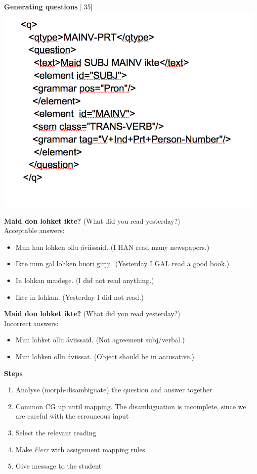 \documentclass[landscape,norsk,11pt]{seminar}
\begin{document}
\begin{slide}
\newslide
\textbf{Generating questions}
\scalebox{.35}[.35]{\includegraphics{img/xml_question.png}}



\newslide
\textbf{Maid don lohket ikte?}
(What did you read yesterday?) \\
Acceptable answers:
\begin{itemize}
\item Mun han lohken ollu \'aviissaid. (I HAN read many newspapers.)
\item Ikte mun gal lohken buori girjji. (Yesterday I GAL read a good book.)
\item In lohkan maidege. (I did not read anything.)
\item Ikte in lohkan. (Yesterday I did not read.)
\end{itemize}

\newslide
\textbf{Maid don lohket ikte?}
(What did you read yesterday?) \\
Incorrect answers:
\begin{itemize}
\item Mun lohket ollu \'aviissaid. (Not agreement subj/verbal.)
\item Mun lohken ollu áviissat. (Object should be in accusative.)
\end{itemize}


\newslide
\textbf{Steps}

\begin{enumerate}
\item Analyse (morph-disambiguate) the question and answer together
\item Common CG up until mapping. The disambiguation is incomplete, since we are careful with the errouneous input
\item Select the relevant reading
\item Make \textit{\&err} with assignment mapping rules
\item Give message to the student
\end{enumerate}


\end{slide}
\end{document}
